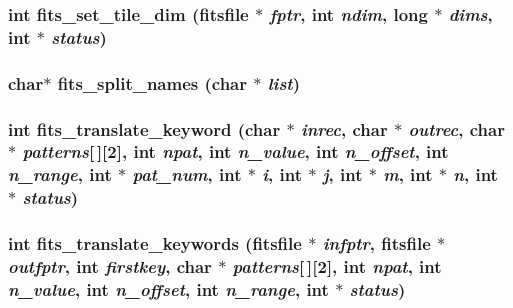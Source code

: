 \subsubsection{\setlength{\rightskip}{0pt plus 5cm}int fits\_\-set\_\-tile\_\-dim (\bf{fitsfile} $\ast$ {\em fptr}, int {\em ndim}, long $\ast$ {\em dims}, int $\ast$ {\em status})}\label{fitsio__64_8h_a5840c3c6e54c9296de02620cdd196e8}


\subsubsection{\setlength{\rightskip}{0pt plus 5cm}char$\ast$ fits\_\-split\_\-names (char $\ast$ {\em list})}\label{fitsio__64_8h_2d84c7dd6f7e5375a4b623fb1bc02947}


\subsubsection{\setlength{\rightskip}{0pt plus 5cm}int fits\_\-translate\_\-keyword (char $\ast$ {\em inrec}, char $\ast$ {\em outrec}, char $\ast$ {\em patterns}[$\,$][2], int {\em npat}, int {\em n\_\-value}, int {\em n\_\-offset}, int {\em n\_\-range}, int $\ast$ {\em pat\_\-num}, int $\ast$ {\em i}, int $\ast$ {\em j}, int $\ast$ {\em m}, int $\ast$ {\em n}, int $\ast$ {\em status})}\label{fitsio__64_8h_df13d3d0ffed68e39ea085c8637f8608}


\subsubsection{\setlength{\rightskip}{0pt plus 5cm}int fits\_\-translate\_\-keywords (\bf{fitsfile} $\ast$ {\em infptr}, \bf{fitsfile} $\ast$ {\em outfptr}, int {\em firstkey}, char $\ast$ {\em patterns}[$\,$][2], int {\em npat}, int {\em n\_\-value}, int {\em n\_\-offset}, int {\em n\_\-range}, int $\ast$ {\em status})}\label{fitsio__64_8h_2895ae781125419a386901494196d211}


